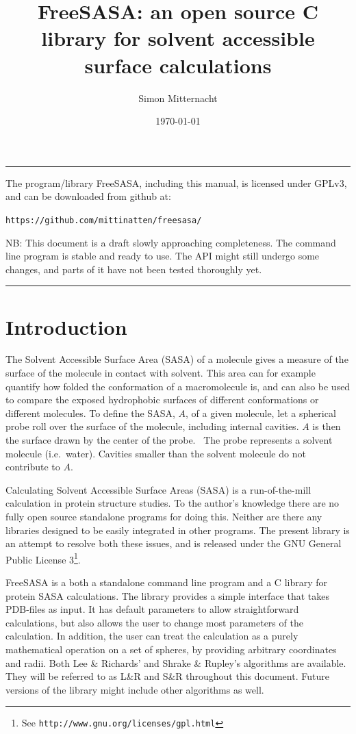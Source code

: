 \documentclass[a4paper,11pt]{article}
\author{Simon Mitternacht}
\date{\today}
\title{FreeSASA: an open source C library for solvent accessible surface
  calculations}
\begin{document}
\maketitle
\hrule\vspace{0.5cm}
\noindent
The program/library FreeSASA, including this manual, is licensed under
GPLv3, and can be downloaded from github at: 
\begin{center}
\texttt{https://github.com/mittinatten/freesasa/}
\end{center}
NB: This document is a draft slowly approaching completeness. The
command line program is stable and ready to use. The API might
still undergo some changes, and parts of it have not been tested
thoroughly yet.
\vspace{0.5cm} \hrule
\section{Introduction}
The Solvent Accessible Surface Area (SASA) of a molecule gives a
measure of the surface of the molecule in contact with solvent. This
area can for example quantify how folded the conformation of a
macromolecule is, and can also be used to compare the exposed
hydrophobic surfaces of different conformations or different
molecules. To define the SASA, $A$, of a given molecule, let a
spherical probe roll over the surface of the molecule, including
internal cavities. $A$ is then the surface drawn by the center of the
probe.~\cite{LnR} The probe represents a solvent molecule
(i.e.\ water). Cavities smaller than the solvent molecule do not
contribute to $A$.

Calculating Solvent Accessible Surface Areas (SASA) is a
run-of-the-mill calculation in protein structure studies. To the
author's knowledge there are no fully open source standalone programs
for doing this. Neither are there any libraries designed to be easily
integrated in other programs. The present library is an attempt to
resolve both these issues, and is released under the GNU General
Public License 3\footnote{See
  \texttt{http://www.gnu.org/licenses/gpl.html}}.

FreeSASA is a both a standalone command line program and a C library
for protein SASA calculations. The library provides a simple interface
that takes PDB-files as input. It has default parameters to allow
straightforward calculations, but also allows the user to change most
parameters of the calculation. In addition, the user can treat the
calculation as a purely mathematical operation on a set of spheres, by
providing arbitrary coordinates and radii. Both Lee \& Richards'
\cite{LnR} and Shrake \& Rupley's \cite{SnR} algorithms are
available. They will be referred to as L\&R and S\&R throughout this
document. Future versions of the library might include other
algorithms as well.
\end{document}
